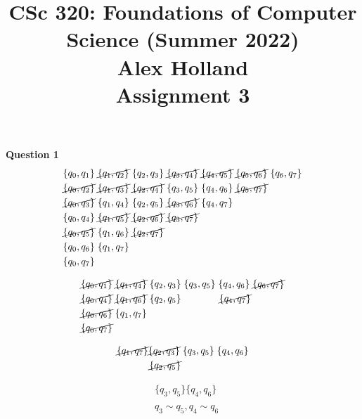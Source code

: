 \documentclass{article}
\title{%
   CSc 320: Foundations of Computer Science (Summer 2022)\\
    \Large Alex Holland \\
    Assignment 3\\
    }
\date{}
\begin{document}
\maketitle

{\bf Question 1}\\
\begin{equation*} 
\begin{split}
   & \{q_0,q_1\} \; \cancel{\{q_1,q_2\}} \; \{q_2,q_3\} \; \cancel{\{q_3,q_4\}} \; \cancel{\{q_4,q_5\}} \; \cancel{\{q_5,q_6\}} \; \{q_6,q_7\} \\
   & \cancel{\{q_0,q_2\}} \; \cancel{\{q_1,q_3\}} \; \cancel{\{q_2,q_4\}} \; \{q_3,q_5\} \; \{q_4,q_6\} \; \cancel{\{q_5,q_7\}} \\
   & \cancel{\{q_0,q_3\}} \; \{q_1,q_4\} \; \{q_2,q_5\} \; \cancel{\{q_3,q_6\}} \; \{q_4,q_7\} \\
   & \{q_0,q_4\} \; \cancel{\{q_1,q_5\}} \; \cancel{\{q_2,q_6\}} \; \cancel{\{q_3,q_7\}} \\
   & \cancel{\{q_0,q_5\}} \; \{q_1,q_6\} \; \cancel{\{q_2,q_7\}} \\
   & \{q_0,q_6\} \; \{q_1,q_7\} \\
   & \{q_0,q_7\} \\
\end{split}
\end{equation*}

\begin{equation*} 
\begin{split}
   & \cancel{\{q_0,q_1\}} \; \cancel{\{q_1,q_4\}} \; \{q_2,q_3\} \; \{q_3,q_5\} \; \{q_4,q_6\} \; \cancel{\{q_6,q_7\}} \\
   & \cancel{\{q_0,q_4\}} \; \cancel{\{q_1,q_6\}} \; \{q_2,q_5\} \;\;\;\;\;\;\;\;\;\;\;\;\;\; \cancel{\{q_4,q_7\}}\\
   & \cancel{\{q_0,q_6\}} \; \{q_1,q_7\} \\
   & \cancel{\{q_0,q_7\}} \\
\end{split}
\end{equation*}

\begin{equation*} 
\begin{split}
   & \cancel{\{q_1,q_7\}} \cancel{\{q_2,q_3\}} \; \{q_3,q_5\} \; \{q_4,q_6\} \\
   & \;\;\;\;\;\;\;\;\;\;\;\; \cancel{\{q_2,q_5\}}
\end{split}
\end{equation*}

\begin{equation*} 
\begin{split}
   & \{q_3,q_5\} \{q_4,q_6\} \\\\
   & q_3 \sim q_5, q_4 \sim q_6\\
\end{split}
\end{equation*}
\end{document}
